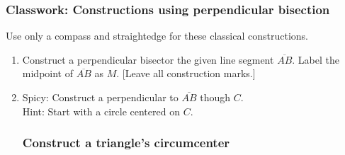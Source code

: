 \documentclass[12pt, oneside]{article}
\begin{document}
\subsubsection*{Classwork: Constructions using perpendicular bisection}
Use only a compass and straightedge for these classical constructions.
  \begin{enumerate}

  \item Construct a perpendicular bisector the given line segment $\overline{AB}$. Label the midpoint of $\overline{AB}$ as $M$.  [Leave all construction marks.]\\
    \vspace{2cm}
    \begin{center}
    \end{center}
    \vspace{3cm}

  \item Spicy: Construct a perpendicular to $\overline{AB}$ though $C$.\\
  Hint: Start with a circle centered on $C$.
    \vspace{4cm}
    \begin{center}
  \end{center} %

\newpage
\subsubsection*{Construct a triangle's circumcenter}


\end{enumerate}
\end{document}
